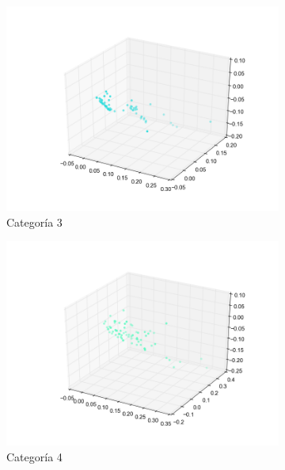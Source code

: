 \begin{figure}[H]
\begin{subfigure}[b]{0.33\textwidth}
                \includegraphics[width=\linewidth]{secciones/graficos/oja/categoria_3.png}
                \caption{Categoría 3}
                \label{fig: ej1_oja_categoria_4}
        \end{subfigure}
        \begin{subfigure}[b]{0.33\textwidth}
                \includegraphics[width=\linewidth]{secciones/graficos/oja/categoria_4.png}
                \caption{Categoría 4}
                \label{fig: ej1_oja_categoria_4}
        \end{subfigure}
        \begin{subfigure}[b]{0.33\textwidth}

\end{subfigure}
\end{figure}
